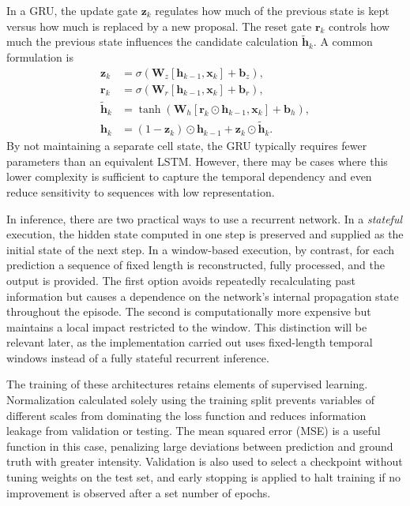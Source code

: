 In a GRU, the update gate $\bm{z}_k$ regulates how much of the previous state is kept versus how much is replaced by a new proposal. The reset gate $\bm{r}_k$ controls how much the previous state influences the candidate calculation $\tilde{\bm{h}}_k$. A common formulation is
\begin{align}
  \bm{z}_k &= \sigma(\bm{W}_z[\bm{h}_{k-1},\bm{x}_k]+\bm{b}_z),\\
  \bm{r}_k &= \sigma(\bm{W}_r[\bm{h}_{k-1},\bm{x}_k]+\bm{b}_r),\\
  \tilde{\bm{h}}_k &=
    \tanh(\bm{W}_h[\bm{r}_k\odot\bm{h}_{k-1},\bm{x}_k]+\bm{b}_h),\\
  \bm{h}_k &= (1-\bm{z}_k)\odot\bm{h}_{k-1}
             +\bm{z}_k\odot\tilde{\bm{h}}_k.
\end{align}
By not maintaining a separate cell state, the GRU typically requires fewer parameters than an equivalent LSTM. However, there may be cases where this lower complexity is sufficient to capture the temporal dependency and even reduce sensitivity to sequences with low representation.

In inference, there are two practical ways to use a recurrent network. In a \emph{stateful} execution, the hidden state computed in one step is preserved and supplied as the initial state of the next step. In a window-based execution, by contrast, for each prediction a sequence of fixed length is reconstructed, fully processed, and the output is provided. The first option avoids repeatedly recalculating past information but causes a dependence on the network's internal propagation state throughout the episode. The second is computationally more expensive but maintains a local impact restricted to the window. This distinction will be relevant later, as the implementation carried out uses fixed-length temporal windows instead of a fully stateful recurrent inference.

The training of these architectures retains elements of supervised learning. Normalization calculated solely using the training split prevents variables of different scales from dominating the loss function and reduces information leakage from validation or testing. The mean squared error (MSE) is a useful function in this case, penalizing large deviations between prediction and ground truth with greater intensity. Validation is also used to select a checkpoint without tuning weights on the test set, and early stopping is applied to halt training if no improvement is observed after a set number of epochs.

